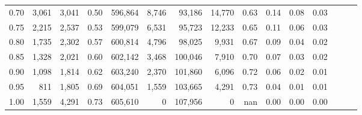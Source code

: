 \begin{tabular}{rrrrrrrrrrrrrrr}
0.70 &    3,061 &   3,041 &  0.50 &  596,864 &    8,746 &   93,186 &   14,770 &  0.63 &  0.14 &  0.08 &      0.03 \\
0.75 &    2,215 &   2,537 &  0.53 &  599,079 &    6,531 &   95,723 &   12,233 &  0.65 &  0.11 &  0.06 &      0.03 \\
0.80 &    1,735 &   2,302 &  0.57 &  600,814 &    4,796 &   98,025 &    9,931 &  0.67 &  0.09 &  0.04 &      0.02 \\
0.85 &    1,328 &   2,021 &  0.60 &  602,142 &    3,468 &  100,046 &    7,910 &  0.70 &  0.07 &  0.03 &      0.02 \\
0.90 &    1,098 &   1,814 &  0.62 &  603,240 &    2,370 &  101,860 &    6,096 &  0.72 &  0.06 &  0.02 &      0.01 \\
0.95 &      811 &   1,805 &  0.69 &  604,051 &    1,559 &  103,665 &    4,291 &  0.73 &  0.04 &  0.01 &      0.01 \\
1.00 &    1,559 &   4,291 &  0.73 &  605,610 &        0 &  107,956 &        0 &   nan &  0.00 &  0.00 &      0.00 \\
\bottomrule
\end{tabular}
